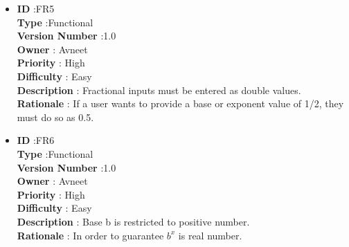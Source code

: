 \documentclass[a4paper,12pt]{report}
\begin{document}
\begin{itemize}
	\item
    \textbf{ID } \hspace{3cm} :FR5  \\
	\textbf{Type } \hspace{2.4cm}  :Functional\\
	\textbf{Version Number} \hspace{0.3cm} :1.0  \\
	\textbf{Owner } \hspace{1.98cm} : Avneet \\
	\textbf{Priority } \hspace{1.75cm} : High\\
	\textbf{Difficulty } \hspace{1.5cm} : Easy\\
	\textbf{Description }\hspace{1.2cm} : Fractional inputs must be entered as double values.\\
	\textbf{Rationale }\hspace{1.6cm} : If a user wants to provide a base or exponent value of 1/2, they must do so as 0.5.\\

	\item
    \textbf{ID } \hspace{3cm} :FR6  \\
	\textbf{Type } \hspace{2.4cm}  :Functional\\
	\textbf{Version Number} \hspace{0.3cm} :1.0  \\
	\textbf{Owner } \hspace{1.98cm} : Avneet \\
	\textbf{Priority } \hspace{1.75cm} : High\\
	\textbf{Difficulty } \hspace{1.5cm} : Easy\\
	\textbf{Description }\hspace{1.2cm} : Base b is restricted to positive number.\\
	\textbf{Rationale }\hspace{1.6cm} : In order to guarantee $b^x$ is real number.\\



\end{itemize}
\end{document}

